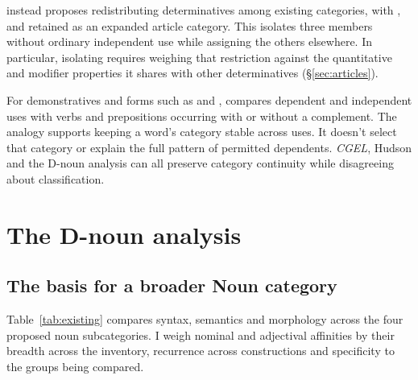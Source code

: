 \documentclass[12pt]{article}
\begin{document}
\textcite{spinillo2004reconceptualising} instead proposes redistributing determinatives among existing categories, with ,  and  retained as an expanded article category. This isolates three members without ordinary independent use while assigning the others elsewhere. In particular, isolating  requires weighing that restriction against the quantitative and modifier properties it shares with other determinatives (§\ref{sec:articles}).

For demonstratives and forms such as  and , \textcite[140--144]{spinillo2004reconceptualising} compares dependent and independent uses with verbs and prepositions occurring with or without a complement. The analogy supports keeping a word's category stable across uses. It doesn't select that category or explain the full pattern of permitted dependents. \textit{CGEL}, Hudson and the D-noun analysis can all preserve category continuity while disagreeing about classification.

\section{The D-noun analysis}\label{sec:proposal}

\subsection{The basis for a broader Noun category}\label{sec:membership}

Table~\ref{tab:existing} compares syntax, semantics and morphology across the four proposed noun subcategories. I weigh nominal and adjectival affinities by their breadth across the inventory, recurrence across constructions and specificity to the groups being compared.
\end{document}

